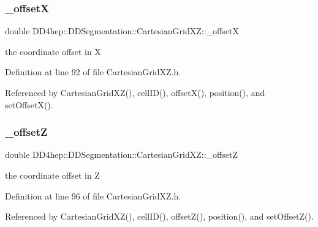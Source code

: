 \subsubsection{\texorpdfstring{\+\_\+offsetX}{\_offsetX}}
{\footnotesize\ttfamily double D\+D4hep\+::\+D\+D\+Segmentation\+::\+Cartesian\+Grid\+X\+Z\+::\+\_\+offsetX\hspace{0.3cm}{\ttfamily [protected]}}



the coordinate offset in X 



Definition at line 92 of file Cartesian\+Grid\+X\+Z.\+h.



Referenced by Cartesian\+Grid\+X\+Z(), cell\+I\+D(), offset\+X(), position(), and set\+Offset\+X().

\hypertarget{class_d_d4hep_1_1_d_d_segmentation_1_1_cartesian_grid_x_z_a2105d391f22a6e8f8d75b0ad85183c21}{}\label{class_d_d4hep_1_1_d_d_segmentation_1_1_cartesian_grid_x_z_a2105d391f22a6e8f8d75b0ad85183c21} 
\subsubsection{\texorpdfstring{\+\_\+offsetZ}{\_offsetZ}}
{\footnotesize\ttfamily double D\+D4hep\+::\+D\+D\+Segmentation\+::\+Cartesian\+Grid\+X\+Z\+::\+\_\+offsetZ\hspace{0.3cm}{\ttfamily [protected]}}



the coordinate offset in Z 



Definition at line 96 of file Cartesian\+Grid\+X\+Z.\+h.



Referenced by Cartesian\+Grid\+X\+Z(), cell\+I\+D(), offset\+Z(), position(), and set\+Offset\+Z().

\hypertarget{class_d_d4hep_1_1_d_d_segmentation_1_1_cartesian_grid_x_z_a49e0f437dc9ab286e9d916dc85d8309a}{}\label{class_d_d4hep_1_1_d_d_segmentation_1_1_cartesian_grid_x_z_a49e0f437dc9ab286e9d916dc85d8309a} 
